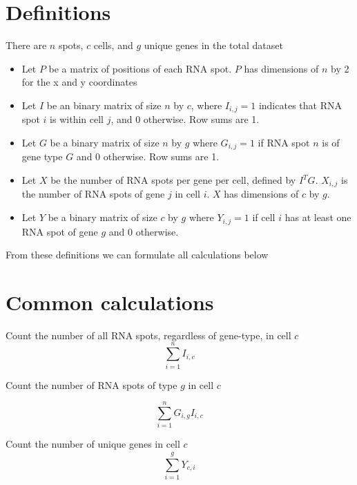 \documentclass[a4paper,12pt]{article}
\begin{document}
\section{Definitions}

There are $n$ spots, $c$ cells, and $g$ unique genes in the total dataset

\begin{itemize}
    \item Let $P$ be a matrix of positions of each RNA spot. $P$ has dimensions of $n$ by 2 for the x and y coordinates

    \item Let $I$ be an binary matrix of size $n$ by $c$, where $I_{i,j} = 1$ indicates that RNA spot $i$ is within cell $j$, and 0 otherwise. Row sums are 1.

    \item Let $G$ be a binary matrix of size $n$ by $g$ where $G_{i,j} = 1$ if RNA spot $n$ is of gene type $G$ and 0 otherwise. Row sums are 1.

    \item Let $X$ be the number of RNA spots per gene per cell, defined by $I^{T}G$. $X_{i,j}$ is the number of RNA spots of gene $j$ in cell $i$. $X$ has dimensions of $c$ by $g$.

    \item Let $Y$ be a binary matrix of size $c$ by $g$ where $Y_{i,j} = 1$ if cell $i$ has at least one RNA spot of gene $g$ and 0 otherwise.

\end{itemize}


From these definitions we can formulate all calculations below

\section{Common calculations}

Count the number of all RNA spots, regardless of gene-type, in cell $c$
\begin{equation}
    \sum_{i=1}^{n} I_{i,c}
\end{equation}


Count the number of RNA spots of type $g$ in cell $c$

\begin{equation}
    \sum_{i=1}^{n} G_{i,g}I_{i,c}
\end{equation}


Count the number of unique genes in cell $c$
\begin{equation}
    \sum_{i=1}^{g} Y_{c,i}
\end{equation}
\end{document}
